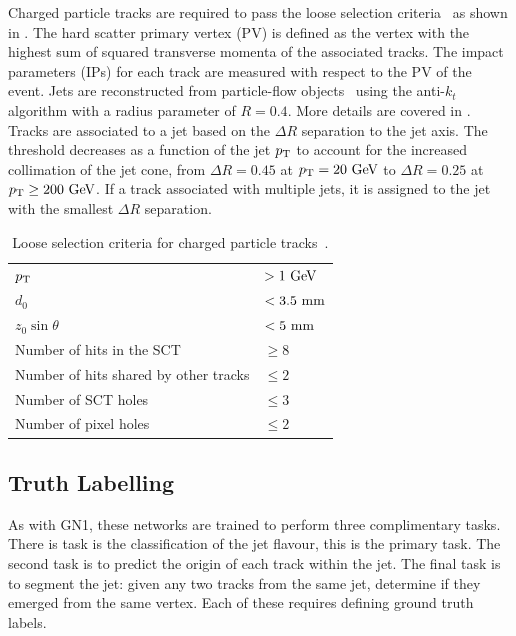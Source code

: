 Charged particle tracks are required to pass the loose selection criteria~\cite{TrackLoose} as shown in .
The hard scatter primary vertex (PV) is defined as the vertex with the highest sum of squared transverse momenta of the associated tracks.
The impact parameters (IPs) for each track are measured with respect to the PV of the event.
Jets are reconstructed from particle-flow objects~\cite{PFlow} using the anti-$k_t$ algorithm with a radius parameter of $R = 0.4$.
More details are covered in .
Tracks are associated to a jet based on the $\Delta R$ separation to the jet axis.
The threshold decreases as a function of the jet $p_{\text{T}}$ to account for the increased collimation of the jet cone, from $\Delta R = 0.45$ at $\pt = 20~\GeV$ to $\Delta R = 0.25$ at $\pt \geq 200~\GeV$.
If a track associated with multiple jets, it is assigned to the jet with the smallest $\Delta R$ separation.

\begin{table}
    \centering
    \begin{tabular}{ll}
        \toprule
        $p_{\text{T}}$ & $> 1~\GeV$ \\
        $d_0$ & $< 3.5~\mm$ \\
        $z_0 \sin \theta$ & $< 5~\mm$ \\
        Number of hits in the SCT & $\geq 8$ \\
        Number of hits shared by other tracks & $\leq 2$ \\
        Number of SCT holes & $\leq 3$ \\
        Number of pixel holes & $\leq 2$ \\
        \bottomrule
    \end{tabular}
    \caption{Loose selection criteria for charged particle tracks~\cite{TrackLoose}.}
    \label{tab:track_loose}
\end{table}

\subsection{Truth Labelling}

As with GN1, these networks are trained to perform three complimentary tasks.
There is task is the classification of the jet flavour, this is the primary task.
The second task is to predict the origin of each track within the jet.
The final task is to segment the jet: given any two tracks from the same jet, determine if they emerged from the same vertex.
Each of these requires defining ground truth labels.

